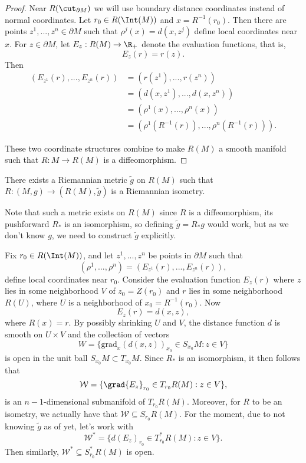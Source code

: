 \begin{proof}
Near $R(\cut_{\partial M})$ we will use boundary distance coordinates instead of normal coordinates.  Let $r_0\in R(\Int(M))$ and $x=R^{-1}(r_0)$.  Then there are points $z^1,...,z^n\in\partial M$ such that $\rho^j(x)=d(x,z^j)$ define local coordinates near $x$.  For $z\in\partial M$, let $E_z:R(M)\to\R_+$ denote the evaluation functions, that is,
$$E_z(r)=r(z).$$
Then
\begin{align*}
	(E_{z^1}(r),...,E_{z^n}(r))&=(r(z^1),...,r(z^n))\\
	&=(d(x,z^1),...,d(x,z^n))\\
	&=(\rho^1(x),...,\rho^n(x))\\
	&=(\rho^1(R^{-1}(r)),...,\rho^n(R^{-1}(r))).
\end{align*}

These two coordinate structures combine to make $R(M)$ a smooth manifold such that $R:M\to R(M)$ is a diffeomorphism.

\end{proof}


\begin{prop}
    There exists a Riemannian metric $\tilde{g}$ on $R(M)$ such that $R:(M,g)\to (R(M),\tilde{g})$ is a Riemannian isometry.
\end{prop}

 Note that such a metric exists on $R(M)$ since $R$ is a diffeomorphism, its pushforward $R_*$ is an isomorphism, so defining $\tilde{g}=R_*g$ would work, but as we don't know $g$, we need to construct $\tilde{g}$ explicitly.

Fix $r_0\in R(\Int(M))$, and let $z^1,...,z^n$ be points in $\partial M$ such that
$$(\rho^1,...,\rho^n)=(E_{z^1}(r),...,E_{z^n}(r)),$$
define local coordinates near $r_0$.  Consider the evaluation function $E_z(r)$ where $z$ lies in some neighborhood $V$ of $z_0=Z(r_0)$ and $r$ lies in some neighborhood $R(U)$, where $U$ is a neighborhood of $x_0=R^{-1}(r_0)$.  Now
$$E_z(r)=d(x,z),$$
where $R(x)=r$.  By possibly shrinking $U$ and $V$, the distance function $d$ is smooth on $U\times V$ and the collection of vectors
$$W=\{\text{grad}_x(d(x,z))_{x_0}\in S_{x_0}M:z\in V\}$$
is open in the unit ball $S_{x_0}M\subset T_{x_0}M$.  Since $R_*$ is an isomorphism, it then follows that
$$\mathcal{W}=\{\grad{E_z}_{r_0}\in T_{r_0}R(M):z\in V\},$$
is an $n-1$-dimensional submanifold of $T_{r_0}R(M)$.  Moreover, for $R$ to be an isometry, we actually have that $\mathcal{W}\subseteq S_{r_0}R(M)$.  For the moment, due to not knowing $\tilde{g}$ as of yet, let's work with
$$\mathcal{W}^*=\{d(E_z)_{r_0}\in T_{r_0}^*R(M):z\in V\}.$$
Then similarly, $\mathcal{W}^*\subseteq S_{r_0}^*R(M)$ is open.

